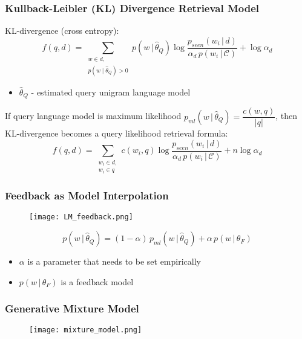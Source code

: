 \subsubsection{Kullback-Leibler (KL) Divergence Retrieval Model}

KL-divergence (cross entropy):
\begin{equation*}
f(q, d) = \sum_{\substack{w \in d, \\ p(w \mid \hat{\theta}_Q)>0}} p(w \,\big|\, \hat{\theta}_Q) \log \frac{p_{seen}(w_i \,\big|\, d)}{\alpha_d \, p(w_i \,\big|\, \mathcal{C})} + \log \alpha_d
\end{equation*}
\begin{itemize}
\item $\hat{\theta}_Q$ - estimated query unigram language model
\end{itemize}


If query language model is maximum likelihood $p_{ml}(w \,\big|\, \hat{\theta}_Q) = \dfrac{c(w, q)}{|q|}$, then KL-divergence becomes a query likelihood retrieval formula:
\begin{equation*}
f(q, d) = \sum_{\substack{w_i \in d, \\ w_i \in q}} c(w_i, q) \log \frac{p_{seen}(w_i \,\big|\, d)}{\alpha_d \, p(w_i \,\big|\, \mathcal{C})} + n \log \alpha_d
\end{equation*}

\subsubsection{Feedback as Model Interpolation}
\begin{figure}[H]
    \centering
    \texttt{[image: LM\_feedback.png]}
\end{figure}

\begin{equation*}
p(w \,\big|\, \hat{\theta}_Q) = (1-\alpha) \, p_{ml}(w \,\big|\, \hat{\theta}_Q) + \alpha \, p(w \,\big|\, \theta_F)
\end{equation*}
\begin{itemize}
\item $\alpha$ is a parameter that needs to be set empirically
\item $p(w \,\big|\, \theta_F)$ is a feedback model
\end{itemize}

\subsubsection{Generative Mixture Model}
\begin{figure}[H]
    \centering
    \texttt{[image: mixture\_model.png]}
\end{figure}

